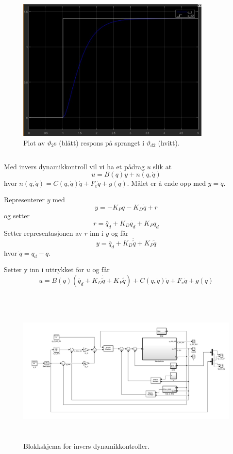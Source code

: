 \documentclass[norsk]{article}
\begin{document}
\begin{figure}[H]
\includegraphics[height=7.2cm]{illustrations/oppg3c_illu2}
\caption{Plot av \(\vartheta_2\)s (blått) respons på spranget i \(\vartheta_{d2}\) (hvitt).}
\end{figure}
\subsection{ }
Med invers dynamikkontroll vil vi ha et pådrag \(u\) slik at
\[u = B(q)y + n(q, \dot{q})\]
hvor \(n(q, \dot{q}) = C(q, \dot{q})\dot{q}+F_v\dot{q} + g(q)\). Målet er å ende opp med \(y = \ddot{q}\).

Representerer \(y\) med
\[y = -K_Pq -K_D\dot{q} + r\]
og setter
\[r = \ddot{q_d} + K_D\dot{q_d} + K_Pq_d\]
Setter representasjonen av \(r\) inn i \(y\) og får
\[y = \ddot{q_d} + K_D\dot{\tilde{q}} + K_P\tilde{q}\]
hvor \(\tilde{q} = q_d - q\).

Setter y inn i uttrykket for \(u\) og får
\[u = B(q)(\ddot{q_d} + K_D\dot{\tilde{q}} + K_P\tilde{q}) + C(q, \dot{q})\dot{q}+F_v\dot{q} + g(q)\]
\subsection{ }
\begin{figure}[H]
\includegraphics[height=7.5cm]{illustrations/oppg3e_illu1}
\caption{Blokkskjema for invers dynamikkontroller.}
\end{figure}
\subsection{ }
\subsection{ }
\subsection{ }
\end{document}
